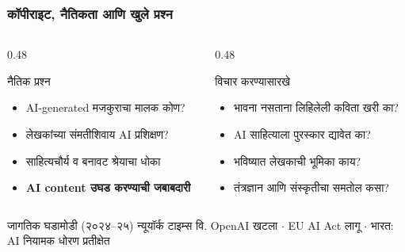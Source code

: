 \begin{frame}[fragile]\frametitle{कॉपीराइट, नैतिकता आणि खुले प्रश्न}

\begin{columns}[T]
\begin{column}{0.48\textwidth}
\begin{alertblock}{नैतिक प्रश्न}
\begin{itemize}
\item AI-generated मजकुराचा मालक कोण?
\item लेखकांच्या संमतीशिवाय AI प्रशिक्षण?
\item साहित्यचौर्य व बनावट श्रेयाचा धोका
\item \textbf{AI content उघड करण्याची जबाबदारी}
\end{itemize}
\end{alertblock}
\end{column}
\begin{column}{0.48\textwidth}
\begin{block}{विचार करण्यासारखे}
\begin{itemize}
\item भावना नसताना लिहिलेली कविता खरी का?
\item AI साहित्याला पुरस्कार द्यावेत का?
\item भविष्यात लेखकाची भूमिका काय?
\item तंत्रज्ञान आणि संस्कृतीचा समतोल कसा?
\end{itemize}
\end{block}
\end{column}
\end{columns}

\vspace{0.2cm}
\begin{exampleblock}{जागतिक घडामोडी (२०२४--२५)}
न्यूयॉर्क टाइम्स वि. OpenAI खटला $\cdot$ EU AI Act लागू $\cdot$ भारत: AI नियामक धोरण प्रतीक्षेत
\end{exampleblock}


\end{frame}

